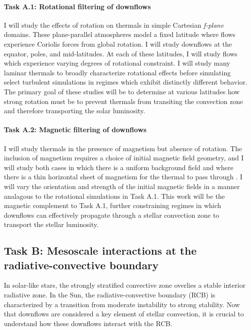 \documentclass[11pt, preprint]{aastex}
\begin{document}
\paragraph{Task A.1: Rotational filtering of downflows}
\label{sct:taskA1}
I will study the effects of rotation on thermals in simple Cartesian \emph{f-plane} domains.
These plane-parallel atmospheres model a fixed latitude where flows experience Coriolis forces from global rotation.
I will study downflows at the equator, poles, and mid-latitudes.
At each of these latitudes, I will study flows which experience varying degrees of rotational constraint.
I will study many laminar thermals to broadly characterize rotational effects before simulating select turbulent simulations in regimes which exhibit distinctly different behavior.
The primary goal of these studies will be to determine at various latitudes how strong rotation must be to prevent thermals from transiting the convection zone and therefore transporting the solar luminosity.

\vspace{-0.7cm}
\paragraph{Task A.2: Magnetic filtering of downflows}
\label{sct:taskA2}
I will study thermals in the presence of magnetism but absence of rotation.
The inclusion of magnetism requires a choice of initial magnetic field geometry, and I will study both cases in which there is a uniform background field and where there is a thin horizontal sheet of magnetism for the thermal to pass through \citep[as in][]{tobias&all1998}.
I will vary the orientation and strength of the initial magnetic fields in a manner analagous to the rotational simulations in Task A.1.
This work will be the magnetic complement to Task A.1, further constraining regimes in which downflows can effectively propagate through a stellar convection zone to transport the stellar luminosity.


\vspace{-0.8cm}
\subsection*{Task B: Mesoscale interactions at the radiative-convective boundary}
\vspace{-0.3cm}
\label{sct:taskB}
In solar-like stars, the strongly stratified convective zone overlies a stable interior radiative zone.
In the Sun, the radiative-convective boundary (RCB) is characterized by a transition from moderate instability to strong stability.
Now that downflows are considered a key element of stellar convection, it is crucial to understand how these downflows interact with the RCB.
\end{document}
